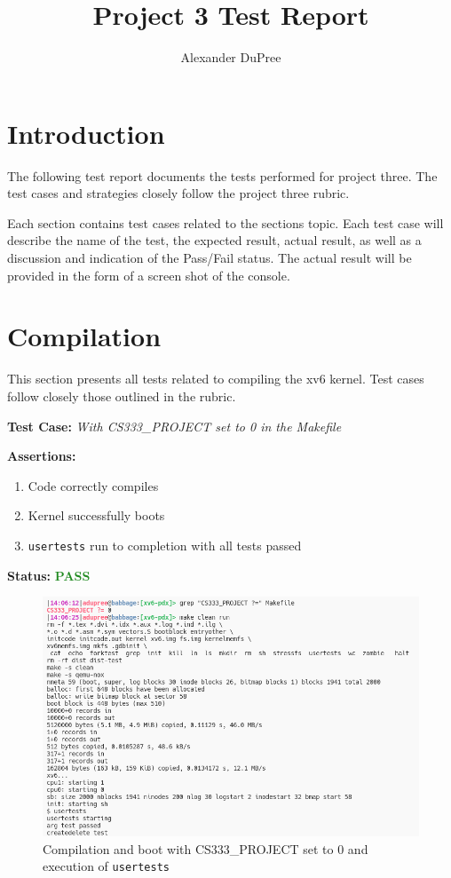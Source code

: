 \documentclass[11pt,letterpaper]{report}
\newcommand{\code}[1]{\colorbox{codegray}{\texttt{#1}}}
\begin{document}
\title{Project 3 Test Report}
\author{Alexander DuPree}

\ifdefined \LF
{\Large     %
\fi

  \maketitle
  \section*{Introduction}
  \noindent
  The following test report documents the tests performed for project three. The test cases and strategies closely follow the project three rubric. 

  Each section contains test cases related to the sections topic. Each test case will describe the name of the test, 
  the expected result, actual result, as well as a discussion and indication of the Pass/Fail status. 
  The actual result will be provided in the form of a screen shot of the console. 

  \section*{Compilation}
  This section presents all tests related to compiling the xv6 kernel.
  Test cases follow closely those outlined in the rubric. \hfill \break
  
  \noindent\textbf{Test Case:} \emph{With CS333\_PROJECT set to 0 in the Makefile}
  
  \noindent\textbf{Assertions:}
  \begin{enumerate}[]
  \item Code correctly compiles
  \item Kernel successfully boots
  \item \code{usertests} run to completion with all tests passed
  \end{enumerate}  
  
  \noindent\textbf{Status:} \textcolor{ForestGreen}{\textbf{PASS}}
  
  \begin{figure}[h!]
	\centering
	\includegraphics[width=1\linewidth]{compilation1-usertests1.png}
	\caption[img]{Compilation and boot with CS333\_PROJECT set to 0 and execution of \code{usertests}}
	\label{fig:P1compileP0-1}
  \end{figure}

}
\end{document}
